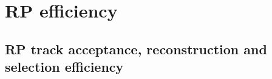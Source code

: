 
\chapter{RP efficiency}\label{appendix:rpEff}

\section{RP track acceptance, reconstruction and selection efficiency}
